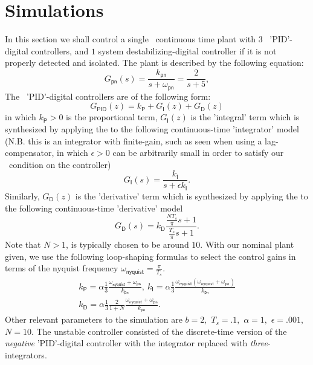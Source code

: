 \section{Simulations}
\label{S:experiments}%
In this section we shall control a single \sop\ continuous time plant
with $3$ \sop\ 'PID'-digital controllers, and $1$
system destabilizing-digital controller if it is not properly detected
and isolated.  The plant is described by the following equation:
\begin{equation*}
G_{\mathsf{pn}}(s) = \frac{k_{\mathsf{pn}}}{s+\omega_{\mathsf{pn}}} = \frac{2}{s+5},
\end{equation*}
The \sop\ 'PID'-digital controllers are of the following form:
\begin{equation*}
G_{\textsf{PID}}(z)=k_{\textsf{P}} + G_{\textsf{I}}(z)  + G_{\textsf{D}}(z)
\end{equation*}
in which $k_{\textsf{P}} > 0$ is the proportional term,
$G_{\textsf{I}}(z)$ is the 'integral' term which is synthesized by
applying the 
\cite[Definition~4]{kottenstette09:_digit_contr_of_multip_discr} to
the following continuous-time 'integrator' model (N.B. this is an
integrator with finite-gain, such as seen when using a
lag-compensator, in which $\epsilon > 0$ can be arbitrarily small in
order to satisfy our \sop\ condition on the controller)
\begin{equation*}
G_{\textsf{I}}(s)=\frac{k_{\textsf{I}}}{s + \epsilon k_{\textsf{I}}}.
\end{equation*}
Similarly, $G_{\textsf{D}}(z)$ is the 'derivative' term which is
synthesized by applying the  to the following
continuous-time 'derivative' model 
\begin{equation*}
G_{\textsf{D}}(s)=k_{\textsf{D}}\frac{\frac{NT_s}{\pi}s+1}{\frac{T_s}{\pi}s + 1}.
\end{equation*}
Note that $N > 1$, is typically chosen to be around $10$.
With our nominal plant given, we use the following loop-shaping
formulas to select the control gains in terms of the nyquist frequency
$\omega_{\mathsf{nyquist}} = \frac{\pi}{T_s}$.
\begin{gather*}
k_{\textsf{P}}=\alpha \frac{1}{3}\frac{\omega_{\mathsf{nyquist}} +
  \omega_{\mathsf{pn}}}{k_{\mathsf{pn}}},\ 
k_{\textsf{I}}=\alpha \frac{1}{3}\frac{\omega_{\mathsf{nyquist}}(\omega_{\mathsf{nyquist}} +
  \omega_{\mathsf{pn}})}{k_{\mathsf{pn}}}\\
k_{\textsf{D}}=\alpha \frac{1}{3}\frac{2}{1+N}\frac{\omega_{\mathsf{nyquist}} +
  \omega_{\mathsf{pn}}}{k_{\mathsf{pn}}}.
\end{gather*}
Other relevant parameters to the simulation are $b = 2,$ $T_s = .1,$ $\alpha =
1,$ $\epsilon = .001,$ $N=10$.  The unstable controller consisted of
the discrete-time version of the {\em negative} 'PID'-digital controller
with the integrator replaced with {\em three}-integrators.


